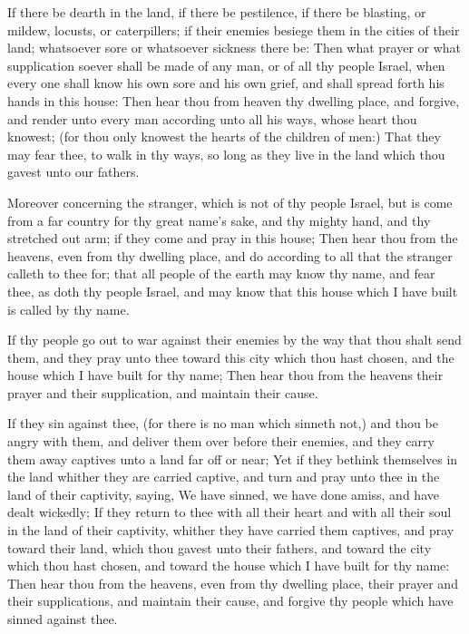 \verse If there be dearth in the land, if there be pestilence, if there be blasting, or mildew, locusts, or caterpillers; if their enemies besiege them in the cities of their land; whatsoever sore or whatsoever sickness there be: \verse Then what prayer or what supplication soever shall be made of any man, or of all thy people Israel, when every one shall know his own sore and his own grief, and shall spread forth his hands in this house: \verse Then hear thou from heaven thy dwelling place, and forgive, and render unto every man according unto all his ways, whose heart thou knowest; (for thou only knowest the hearts of the children of men:) \verse That they may fear thee, to walk in thy ways, so long as they live in the land which thou gavest unto our fathers.

\verse Moreover concerning the stranger, which is not of thy people Israel, but is come from a far country for thy great name's sake, and thy mighty hand, and thy stretched out arm; if they come and pray in this house; \verse Then hear thou from the heavens, even from thy dwelling place, and do according to all that the stranger calleth to thee for; that all people of the earth may know thy name, and fear thee, as doth thy people Israel, and may know that this house which I have built is called by thy name.

\verse If thy people go out to war against their enemies by the way that thou shalt send them, and they pray unto thee toward this city which thou hast chosen, and the house which I have built for thy name; \verse Then hear thou from the heavens their prayer and their supplication, and maintain their cause.

\verse If they sin against thee, (for there is no man which sinneth not,) and thou be angry with them, and deliver them over before their enemies, and they carry them away captives unto a land far off or near; \verse Yet if they bethink themselves in the land whither they are carried captive, and turn and pray unto thee in the land of their captivity, saying, We have sinned, we have done amiss, and have dealt wickedly; \verse If they return to thee with all their heart and with all their soul in the land of their captivity, whither they have carried them captives, and pray toward their land, which thou gavest unto their fathers, and toward the city which thou hast chosen, and toward the house which I have built for thy name: \verse Then hear thou from the heavens, even from thy dwelling place, their prayer and their supplications, and maintain their cause, and forgive thy people which have sinned against thee.

